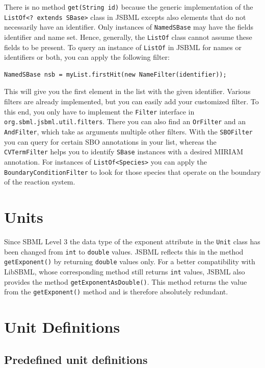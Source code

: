 \documentclass[
  BCOR12mm,
  letterpaper,
  11pt,
  headsepline,
  pointlessnumbers,
  tablecaptionabove,
  headinclude,
  appendixprefix,
  idxtotoc,
  bibtotoc,
  twoside,
  titlepage
]{scrartcl}
\begin{document}
There is no method \verb!get(String id)! because the generic implementation of 
the \verb!ListOf<? extends SBase>! class in JSBML excepts also elements that do 
not necessarily have an identifier. Only instances of \verb!NamedSBase! may have
the fields identifier and name set. Hence, generally, the \verb!ListOf! class 
cannot assume these fields to be present. To query an instance of \verb!ListOf! 
in JSBML for names or identifiers or both, you can apply the following filter:
\begin{verbatim}
NamedSBase nsb = myList.firstHit(new NameFilter(identifier));
\end{verbatim}
This will give you the first element in the list with the given identifier.
Various filters are already implemented, but you can easily add your 
customized filter. To this end, you only have to implement the \verb!Filter! 
interface in \verb!org.sbml.jsbml.util.filters!. There you can also find an
\verb!OrFilter! and an \verb!AndFilter!, which take as arguments multiple other
filters. With the \verb!SBOFilter! you can query for certain SBO annotations in
your list, whereas the \verb!CVTermFilter! helps you to identify \verb!SBase!
instances with a desired MIRIAM annotation. For instances of
\verb!ListOf<Species>! you can apply the \verb!BoundaryConditionFilter! to look
for those species that operate on the boundary of the reaction system.


\section{Units}

Since SBML Level 3 the data type of the exponent attribute in the \verb!Unit!
class has been changed from \verb!int! to \verb!double! values. JSBML reflects
this in the method \verb!getExponent()! by returning \verb!double! values only.
For a better compatibility with LibSBML, whose corresponding method still
returns \verb!int! values, JSBML also provides the method
\verb!getExponentAsDouble()!. This method returns the value from the
\verb!getExponent()! method and is therefore absolutely redundant.

\section{Unit Definitions}

\subsection{Predefined unit definitions}
\end{document}
